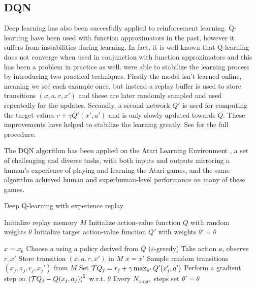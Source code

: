 \subsection{DQN}

Deep learning has also been succesfully applied to reinforcement learning. Q-learning have been used with function approximators in the past\cite{neco}, however it suffers from instabilities during learning. In fact, it is well-known that Q-learning does not converge when used in conjunction with function approximators \cite{...} and this has been a problem in practice as well. \citet{mnih2015human} were able to stabilize the learning process by introducing two practical techniques. Firstly the model isn't learned online, meaning we see each example once, but instead a replay buffer is used to store transitions $(x, a, r, x')$ and these are later randomly sampled and used repeatedly for the updates. Secondly, a second network $Q'$ is used for computing the target values $r + \gamma Q'(x', a')$ and is only slowly updated towards $Q$. These improvements have helped to stabilize the learning greatly. See  for the full procedure.

The DQN algorithm has been applied on the Atari Learning Environment \cite{atari}, a set of challenging and diverse tasks, with both inputs and outputs mirroring a human's experience of playing and learning the Atari games, and the same algorithm achieved human and superhuman-level performance on many of these games.

\begin{algorithm}
\caption{Deep Q-learning with experience replay}
\begin{algorithmic}\label{alg:dqn}

    \STATE Initialize replay memory $M$
    \STATE Initialize action-value function $Q$ with random weights $\theta$
    \STATE Initialize target action-value function $Q'$ with weights $\theta'=\theta$

    \STATE $x=x_0$
	\STATE Choose $a$ using a policy derived from $Q$ ($\varepsilon$-greedy)
	\STATE Take action $a$, observe $r, x'$
	\STATE Store transition $(x, a, r, x')$ in $M$
	\STATE $x = x'$
	\STATE Sample random transitions $(x_j, a_j, r_j, x_j')$ from $M$
	\STATE Set $\mathcal{T} Q_j=r_j + \gamma \max_{a'} Q'(x_j', a')$
    \STATE Perform a gradient step on $\left( {\mathcal{T} Q_j - Q(x_j, a_j)} \right)^2$ w.r.t. $\theta$
    \STATE Every $N_\text{target}$ steps set $\theta'=\theta$
	\ENDWHILE
	\ENDFOR
	
\end{algorithmic}
\end{algorithm}


